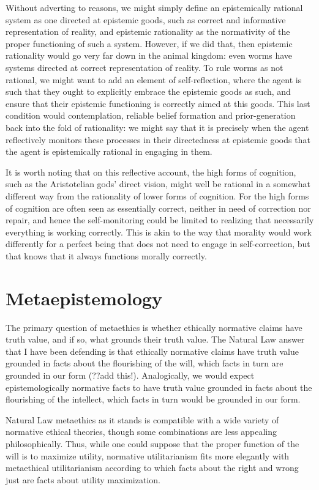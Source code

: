 Without adverting to reasons, we might simply define an epistemically rational system as one directed at 
epistemic goods, such as correct and informative representation of reality, and epistemic rationality as 
the normativity of the proper functioning of such a system. However, if we did that, then epistemic rationality
would go very far down in the animal kingdom: even worms have systems directed at correct representation of 
reality. To rule worms as not rational, we might want to add an element of self-reflection, where the agent 
is such that they ought to explicitly embrace the epistemic goods as such, and ensure that their epistemic 
functioning is correctly aimed at this goods. This last condition would contemplation, reliable
belief formation and prior-generation back into the fold of rationality: we might say that it is precisely 
when the agent reflectively monitors these processes in their directedness at epistemic goods that the 
agent is epistemically rational in engaging in them. 

It is worth noting that on this reflective account, the high forms of cognition, such as the 
Aristotelian gods' direct vision, might well be rational in a somewhat different way from the rationality 
of lower forms of cognition. For the high forms of cognition 
are often seen as essentially correct, neither in need of correction nor repair, and hence the 
self-monitoring could be limited to realizing that necessarily everything is working correctly. 
This is akin to the way that morality would work differently for a perfect being that does not need 
to engage in self-correction, but that knows that it always functions morally correctly. 

\section{Metaepistemology}
The primary question of metaethics is whether ethically normative claims have truth value, and if so, what grounds their truth value.
The Natural Law answer that I have been defending is that ethically normative claims have truth value grounded in facts about the 
flourishing of the will, which facts in turn are grounded in our form (??add this!). Analogically, we would expect epistemologically 
normative facts to have truth value grounded in facts about the flourishing of the intellect, which facts in turn would be grounded
in our form.

Natural Law metaethics as it stands is compatible with a wide variety of normative ethical theories, though some combinations are
less appealing philosophically. Thus, while one could suppose that the proper function of the will is to maximize utility, 
normative utilitarianism fits more elegantly with metaethical utilitarianism according to which facts about the right
and wrong just are facts about utility maximization. 


